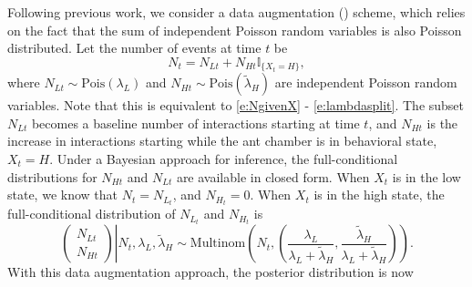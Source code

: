 \documentclass[smallextended]{svjour3}       %
\begin{document}
Following previous work, we consider a data augmentation (\cite{Tanner1987, VanDyk2001}) scheme, which relies on the fact that the sum of independent Poisson random variables is also Poisson distributed. Let the number of events at time $t$ be
\begin{equation}
N_t = N_{Lt} + {N}_{Ht} \mathbb{I}_{\{X_t = H\}},
\end{equation}
where $N_{Lt} \sim \text{Pois}(\lambda_L)$ and $N_{Ht} \sim \text{Pois}(\tilde{\lambda}_H)$ are independent Poisson random variables.
Note that this is equivalent to \eqref{e:NgivenX} - \eqref{e:lambdasplit}. The subset $N_{Lt}$ becomes a baseline number of interactions starting at time $t$, and $N_{Ht}$ is the increase in interactions starting while the ant chamber is in behavioral state, $X_t = H$. Under a Bayesian approach for inference, the full-conditional distributions for $N_{Ht}$ and $N_{Lt}$ are available in closed form. When $X_t$ is in the low state, we know that $N_t = N_{L_t}$, and $N_{H_t} = 0$. When $X_t$ is in the high state, the full-conditional distribution of $N_{L_t}$ and $N_{H_t}$ is
\begin{equation}
\left. \begin{pmatrix}
    	N_{Lt}\\
        N_{Ht}
    	\end{pmatrix} \right| N_t, \lambda_L, \tilde{\lambda}_H  \sim 
\text{Multinom}\left(N_t,  \left(\frac{\lambda_L}{\lambda_L + \tilde{\lambda}_H}, \frac{\tilde{\lambda}_H}{\lambda_L + \tilde{\lambda}_H}\right)\right).
\label{e:splitNdist}
\end{equation}
With this data augmentation approach, the posterior distribution is now
\end{document}
